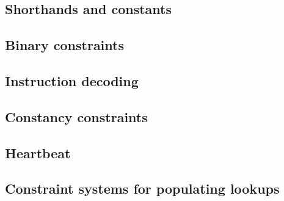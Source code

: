 \subsection{Shorthands and constants}                      \label{oob: generalities: shorthands}                  
\subsection{Binary constraints}                            \label{oob: generalities: binary}                      
\subsection{Instruction decoding}                          \label{oob: generalities: instruction decoding}        
\subsection{Constancy constraints}                         \label{oob: generalities: counter-constancies}         
\subsection{Heartbeat}                                     \label{oob: generalities: heartbeat}                   
\subsection{Constraint systems for populating lookups}     \label{oob: generalities: specialized constraints}     
